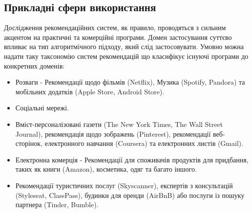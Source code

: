 \subsection{Прикладні сфери використання}

Дослідження рекомендаційних систем, як правило, проводяться з сильним акцентом на практичні та комерційні програми. Домен застосування суттєво впливає на тип алгоритмічного підходу, який слід застосовувати. Умовно можна надати таку таксономію систем рекомендацій що класифікує існуючі програми до конкретних доменів:
\begin{itemize}
    \item  Розваги - Рекомендації щодо фільмів (Netflix), Музика (Spotify, Pandora) та мобільних додатків (Apple Store, Android Store).
    \item Соціальні мережі.
    \item Вміст-персоналізовані газети (The New York Times, The Wall Street Journal), рекомендація щодо зображень (Pinterest), рекомендації веб-сторінок, електронного навчання (Coursera) та електронних листів (Gmail).
    \item Електронна комерція - Рекомендації для споживачів продуктів для придбання, таких як книги (Amazon), косметика, одяг та багато іншого.
    \item Рекомендації туристичних послуг (Skyscanner), експертів з консультацій (Styleseat, ClassPass), будинки для оренди (AirBnB) або послуги із пошуку партнера (Tinder, Bumble).
\end{itemize}

